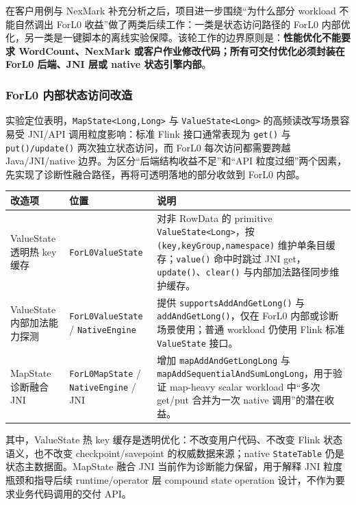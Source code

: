 \documentclass[a4paper,11pt]{article}
\begin{document}
在客户用例与 NexMark 补充分析之后，项目进一步围绕“为什么部分 workload 不能自然调出 ForL0 收益”做了两类后续工作：一类是状态访问路径的 ForL0 内部优化，另一类是一键脚本的离线实验保障。该轮工作的边界原则是：\textbf{性能优化不能要求 WordCount、NexMark 或客户作业修改代码；所有可交付优化必须封装在 ForL0 后端、JNI 层或 native 状态引擎内部}。

\subsubsection{ForL0 内部状态访问改造}

实验定位表明，\texttt{MapState<Long,Long>} 与 \texttt{ValueState<Long>} 的高频读改写场景容易受 JNI/API 调用粒度影响：标准 Flink 接口通常表现为 \texttt{get()} 与 \texttt{put()/update()} 两次独立状态访问，而 ForL0 每次访问都需要跨越 Java/JNI/native 边界。为区分“后端结构收益不足”和“API 粒度过细”两个因素，先实现了诊断性融合路径，再将可透明落地的部分收敛到 ForL0 内部。

\begin{table}[H]
\centering
\small
\begin{tabularx}{\textwidth}{L{3.4cm} L{4.4cm} X}
\toprule
\textbf{改造项} & \textbf{位置} & \textbf{说明} \\
\midrule
ValueState 透明热 key 缓存 & \texttt{ForL0ValueState} & 对非 RowData 的 primitive \texttt{ValueState<Long>}，按 \texttt{(key,keyGroup,namespace)} 维护单条目缓存；\texttt{value()} 命中时跳过 JNI get，\texttt{update()}、\texttt{clear()} 与内部加法路径同步维护缓存。 \\
ValueState 内部加法能力探测 & \texttt{ForL0ValueState} / \texttt{NativeEngine} & 提供 \texttt{supportsAddAndGetLong()} 与 \texttt{addAndGetLong()}，仅在 ForL0 内部或诊断场景使用；普通 workload 仍使用 Flink 标准 \texttt{ValueState} 接口。 \\
MapState 诊断融合 JNI & \texttt{ForL0MapState} / \texttt{NativeEngine} / JNI & 增加 \texttt{mapAddAndGetLongLong} 与 \texttt{mapAddSequentialAndSumLongLong}，用于验证 map-heavy scalar workload 中“多次 get/put 合并为一次 native 调用”的潜在收益。 \\
\bottomrule
\end{tabularx}
\end{table}

其中，ValueState 热 key 缓存是透明优化：不改变用户代码、不改变 Flink 状态语义，也不改变 checkpoint/savepoint 的权威数据来源；native \texttt{StateTable} 仍是状态主数据面。MapState 融合 JNI 当前作为诊断能力保留，用于解释 JNI 粒度瓶颈和指导后续 runtime/operator 层 compound state operation 设计，不作为要求业务代码调用的交付 API。
\end{document}
